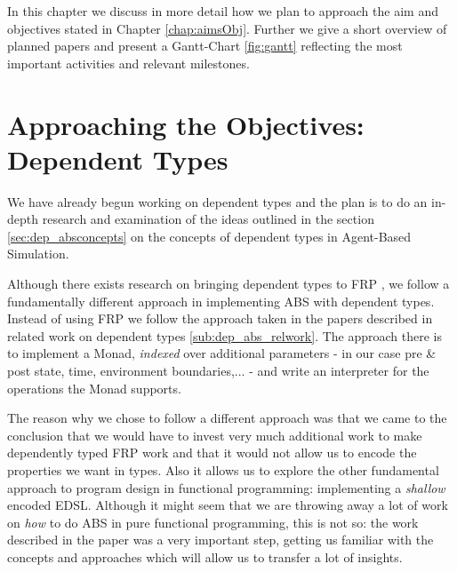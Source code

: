 
In this chapter we discuss in more detail how we plan to approach the aim and objectives stated in Chapter \ref{chap:aimsObj}. Further we give a short overview of planned papers and present a Gantt-Chart \ref{fig:gantt} reflecting the most important activities and relevant milestones.

\section{Approaching the Objectives: Dependent Types}
We have already begun working on dependent types and the plan is to do an in-depth research and examination of the ideas outlined in the section \ref{sec:dep_absconcepts} on the concepts of dependent types in Agent-Based Simulation.

Although there exists research on bringing dependent types to FRP \cite{sculthorpe_safe_2009}, we follow a fundamentally different approach in implementing ABS with dependent types. Instead of using FRP we follow the approach taken in the papers described in related work on dependent types \ref{sub:dep_abs_relwork}. The approach there is to implement a Monad, \textit{indexed} over additional parameters - in our case pre \& post state, time, environment boundaries,... - and write an interpreter for the operations the Monad supports.

The reason why we chose to follow a different approach was that we came to the conclusion that we would have to invest very much additional work to make dependently typed FRP work and that it would not allow us to encode the properties we want in types. Also it allows us to explore the other fundamental approach to program design in functional programming: implementing a \textit{shallow} encoded EDSL. Although it might seem that we are throwing away a lot of work on \textit{how} to do ABS in pure functional programming, this is not so: the work described in the paper was a very important step, getting us familiar with the concepts and approaches which will allow us to transfer a lot of insights. %

